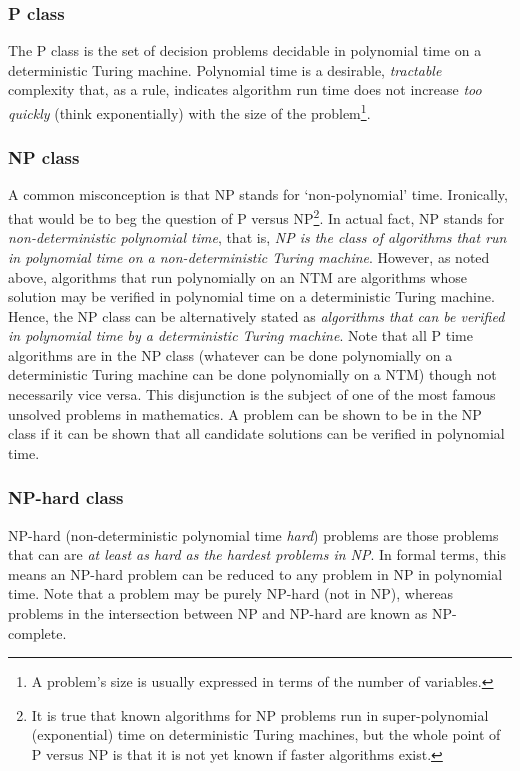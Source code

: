 \documentclass[11pt]{amsart}
\begin{document}
\subsubsection{P class}

The P class is the set of decision problems decidable in polynomial time on a deterministic Turing machine. Polynomial time is a desirable, \emph{tractable} complexity that, as a rule, indicates algorithm run time does not increase \emph{too quickly} (think exponentially) with the size of the problem\footnote{A problem's size is usually expressed in terms of the number of variables.}.

\subsubsection{NP class}

A common misconception is that NP stands for `non-polynomial' time. Ironically, that would be to beg the question of P versus NP\footnote{It is true that known algorithms for NP problems run in super-polynomial (exponential) time on deterministic Turing machines, but the whole point of P versus NP is that it is not yet known if faster algorithms exist.}. In actual fact, NP stands for \emph{non-deterministic polynomial time}, that is, \emph{NP is the class of algorithms that run in polynomial time on a non-deterministic Turing machine}. However, as noted above, algorithms that run polynomially on an NTM are algorithms whose solution may be verified in polynomial time on a deterministic Turing machine. Hence, the NP class can be alternatively stated as \emph{algorithms that can be verified in polynomial time by a deterministic Turing machine}. Note that all P time algorithms are in the NP class (whatever can be done polynomially on a deterministic Turing machine can be done polynomially on a NTM) though not necessarily vice versa. This disjunction is the subject of one of the most famous unsolved problems in mathematics. A problem can be shown to be in the NP class if it can be shown that all candidate solutions can be verified in polynomial time.

\subsubsection{NP-hard class}

NP-hard (non-deterministic polynomial time \emph{hard}) problems are those problems that can are \emph{at least as hard as the hardest problems in NP}. In formal terms, this means an NP-hard problem can be reduced to any problem in NP in polynomial time. Note that a problem may be purely NP-hard (not in NP), whereas problems in the intersection between NP and NP-hard are known as NP-complete.
\end{document}
